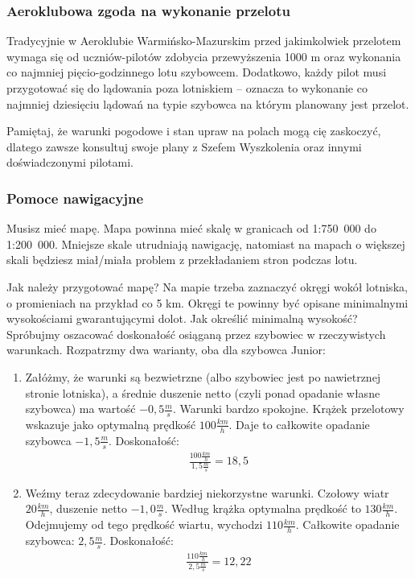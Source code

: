 \documentclass{article}
\begin{document}
\subsubsection{Aeroklubowa zgoda na wykonanie przelotu}
Tradycyjnie w Aeroklubie Warmińsko-Mazurskim przed jakimkolwiek przelotem
wymaga się od uczniów-pilotów zdobycia przewyższenia 1000 m oraz wykonania
co najmniej pięcio-godzinnego lotu szybowcem. Dodatkowo, każdy pilot musi
przygotować się do lądowania poza lotniskiem -- oznacza to wykonanie co
najmniej dziesięciu lądowań na typie szybowca na którym planowany jest
przelot.

Pamiętaj, że warunki pogodowe i stan upraw na polach mogą cię zaskoczyć,
dlatego zawsze konsultuj swoje plany z Szefem Wyszkolenia oraz innymi
doświadczonymi pilotami.

\subsubsection{Pomoce nawigacyjne}
Musisz mieć mapę. Mapa powinna mieć skalę
w granicach od 1:750~000 do 1:200~000. Mniejsze skale utrudniają
nawigację, natomiast na mapach o większej skali będziesz miał/miała
problem z przekładaniem stron podczas lotu.

Jak należy przygotować mapę? Na mapie trzeba zaznaczyć okręgi
wokół lotniska, o promieniach
na przykład co 5 km. Okręgi te powinny być opisane minimalnymi
wysokościami gwarantującymi dolot. Jak określić minimalną wysokość?
Spróbujmy oszacować doskonałość osiąganą przez szybowiec w rzeczywistych
warunkach. Rozpatrzmy dwa warianty, oba dla szybowca Junior:

\begin{enumerate}
\item Załóżmy, że warunki są bezwietrzne (albo szybowiec jest po
    nawietrznej stronie lotniska), a średnie duszenie netto
    (czyli ponad opadanie własne szybowca) ma wartość
    $-0,5 \frac{m}{s}$. Warunki bardzo spokojne. Krążek przelotowy
    wskazuje jako optymalną prędkość $100 \frac{km}{h}$. Daje
    to całkowite opadanie szybowca $-1,5 \frac{m}{s}$. Doskonałość:
    \begin{align*}
        \frac{100 \frac{km}{h}}{1,5 \frac{m}{s}} = 18,5
    \end{align*}

\item Weźmy teraz zdecydowanie bardziej niekorzystne warunki. Czołowy
    wiatr $20 \frac{km}{h}$, duszenie netto $-1,0 \frac{m}{s}$.
    Według krążka optymalna prędkość to $130 \frac{km}{h}$.
    Odejmujemy od tego prędkość wiartu, wychodzi $110 \frac{km}{h}$.
    Całkowite opadanie szybowca: $2,5 \frac{m}{s}$. Doskonałość:
    \begin{align*}
        \frac{110 \frac{km}{h}}{2,5 \frac{m}{s}} = 12,22
    \end{align*}
\end{enumerate}
\end{document}
